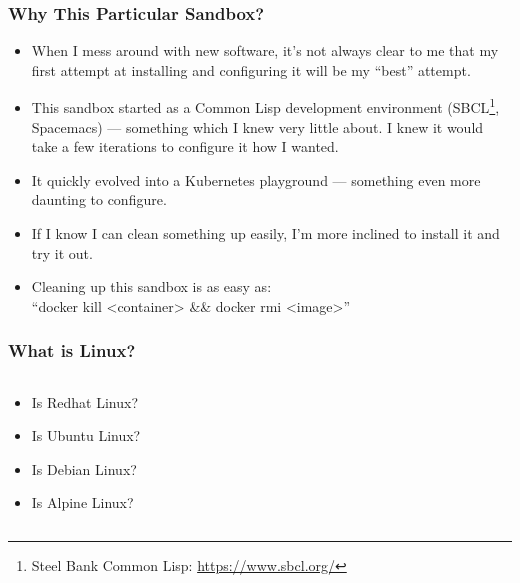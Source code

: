     \begin{frame}
      \frametitle{Why This Particular Sandbox?}
      \begin{itemize}
      \item<2->When I mess around with new software, it's not always clear to me that
        my first attempt at installing and configuring it will be my ``best'' attempt.
      \item<3->This sandbox started as a Common Lisp development environment
        (SBCL\footnote<3->{Steel Bank Common Lisp: \href{https://www.sbcl.org/}{https://www.sbcl.org/}}, Spacemacs) --- something which I knew very little about. I knew
        it would take a few iterations to configure it how I wanted.
      \item<4->It quickly evolved into a Kubernetes playground --- something
        even more daunting to configure.
      \item<5->If I know I can clean something up easily, I'm more inclined to
        install it and try it out.
      \item<6->Cleaning up this sandbox is as easy as:\\``docker kill <container> \&\& docker rmi <image>''
      \end{itemize}
    \end{frame}

    \begin{frame}
    \frametitle{What is Linux?}
    \begin{columns}
        \begin{column}{0.5\textwidth}
            \begin{itemize}
                \item<2->Is Redhat Linux?
                \item<3->Is Ubuntu Linux?
                \item<4->Is Debian Linux?
                \item<5->Is Alpine Linux?
            \end{itemize}
        \end{column}
        \begin{column}{0.5\textwidth}
          \begin{center}
          \end{center}
        \end{column}
    \end{columns}
    \end{frame}

